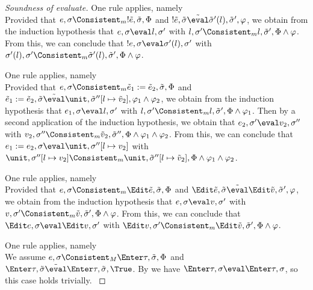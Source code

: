 \begin{proof}[Soundness of evaluate]
    {One rule applies, namely \\
    Provided that $e,\sigma\Consistent_m !\tilde{e},\tilde{\sigma},\Phi$ and $!\tilde{e},\tilde{\sigma}\tilde{\eval}\tilde{\sigma}'(l),\tilde{\sigma}',\phi$,
    we obtain from the induction hypothesis that $e,\sigma\eval l,\sigma'$ with $l,\sigma'\Consistent_m l,\tilde{\sigma}',\Phi\land\phi$.
    From this, we can conclude that $!e,\sigma\eval \sigma'(l),\sigma'$ with $\sigma'(l),\sigma'\Consistent_m \tilde{\sigma}'(l),\tilde{\sigma}',\Phi\land\phi$.
  }

    {
    One rule applies, namely \\
    Provided that $e,\sigma\Consistent_m\tilde{e}_1:=\tilde{e}_2,\tilde{\sigma},\Phi$ and $\tilde{e}_1:=\tilde{e}_2,\tilde{\sigma}\tilde{\eval}\unit,\tilde{\sigma}''[l\mapsto \tilde{v}_2],\phi_1\land\phi_2$,
    we obtain from the induction hypothesis that $e_1,\sigma\eval l,\sigma'$ with $l,\sigma'\Consistent_m l,\tilde{\sigma}',\Phi\land\phi_1$.
    Then by a second application of the induction hypothesis, we obtain that $e_2,\sigma'\eval v_2,\sigma''$ with $v_2,\sigma''\Consistent_m\tilde{v}_2,\tilde{\sigma}'',\Phi\land\phi_1\land\phi_2$.
    From this, we can conclude that $e_1 := e_2,\sigma\eval \unit,\sigma''[l\mapsto v_2]$ with $\unit,\sigma''[l\mapsto v_2]\Consistent_m\unit,\tilde{\sigma}''[l\mapsto\tilde{v}_2],\Phi\land\phi_1\land\phi_2$.
    }

    {One rule applies, namely \\
    Provided that $e,\sigma\Consistent_m \Edit\tilde{e},\tilde{\sigma},\Phi$ and $\Edit\tilde{e},\tilde{\sigma}\tilde{\eval}\Edit\tilde{v},\tilde{\sigma}',\phi$,
    we obtain from the induction hypothesis that $e,\sigma\eval v,\sigma'$ with $v,\sigma'\Consistent_m \tilde{v},\tilde{\sigma}',\Phi\land\phi$.
    From this, we can conclude that $\Edit e,\sigma\eval \Edit v,\sigma'$ with $\Edit v,\sigma'\Consistent_m \Edit\tilde{v},\tilde{\sigma}',\Phi\land\phi$.

    }

    {
    One rule applies, namely \\
    We assume $e,\sigma\Consistent_M\Enter\tau,\tilde{\sigma},\Phi$ and $\Enter\tau,\tilde{\sigma}\tilde{\eval}\Enter\tau,\tilde{\sigma},\True$.
    By  we have $\Enter\tau,\sigma\eval \Enter\tau,\sigma$, so this case holds trivially.
    }


\end{proof}
